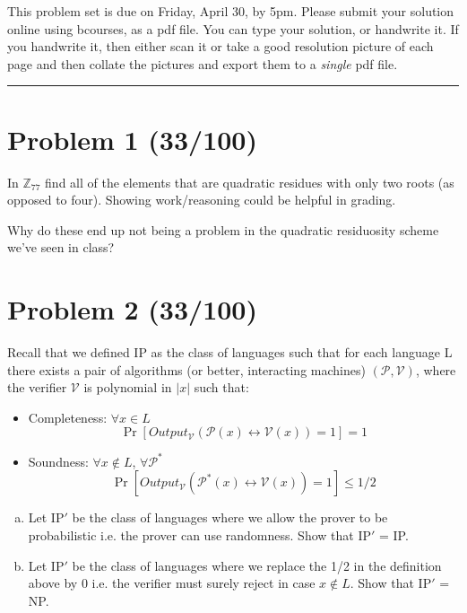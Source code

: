 \documentclass[11pt]{article}
\begin{document}
This problem set is due on Friday, April 30, by 5pm. Please submit your solution online using bcourses,
as a pdf file.
You can type your solution, or handwrite it. If you handwrite it, then either
scan it or take a good resolution picture of each page and then collate the pictures
and export them to a {\em single} pdf file.
\bigskip
\hrule


\section*{Problem 1 (33/100)}
In $\mathbb{Z}_{77}$ find all of the elements that are quadratic residues with only two roots (as opposed to four).  Showing work/reasoning could be helpful in grading.

\noindent Why do these end up not being a problem in the quadratic residuosity scheme we've seen in class?


\section*{Problem 2 (33/100)}
Recall that we defined IP as the class of languages such that for each language L there exists a pair of algorithms (or better, interacting machines) $(\mathcal{P},\mathcal{V})$, where the verifier $\mathcal{V}$ is polynomial in $|x|$ such that:
		\begin{itemize}
			\item Completeness: $\forall x\in L$ 
		$$\Pr\left[Output_{\mathcal{V}}(\mathcal{P}(x) \leftrightarrow \mathcal{V}(x))=1\right]=1$$
			\item Soundness: $\forall x\notin L$, $\forall \mathcal{P}^*$ 
		$$\Pr\left[Output_{\mathcal{V}}(\mathcal{P}^*(x) \leftrightarrow \mathcal{V}(x))=1\right]\leq 1/2$$
		\end{itemize}
		
\begin{enumerate}[a)]
\item Let IP$'$ be the class of languages where we allow the prover to be probabilistic i.e. the prover can use randomness. Show that IP$'$ = IP.

\item Let IP$'$ be the class of languages where we replace the 1/2 in the definition above by 0 i.e. the verifier must surely reject in case $x\notin L$. Show that IP$'$ = NP.
\end{enumerate}
\end{document}
